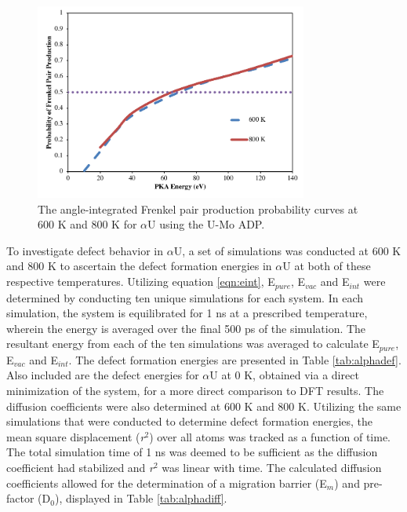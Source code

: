 \documentclass[review]{elsarticle}
\begin{document}
\begin{figure}[h]
 \centering
 \includegraphics[width=0.8\textwidth]{alphaA.png} 	
 \caption{The angle-integrated Frenkel pair production probability curves at 600 K and 800 K for $\alpha$U using the U-Mo ADP.}
 \label{fig:alpha}
\end{figure}

\FloatBarrier

To investigate defect behavior in $\alpha$U, a set of simulations was conducted at 600 K and 800 K to ascertain the defect formation energies in $\alpha$U at both of these respective temperatures. Utilizing equation \ref{eqn:eint}, E$_{pure}$, E$_{vac}$ and E$_{int}$ were determined by conducting ten unique simulations for each system. In each simulation, the system is equilibrated for 1 ns at a prescribed temperature, wherein the energy is averaged over the final 500 ps of the simulation. The resultant energy from each of the ten simulations was averaged to calculate E$_{pure}$, E$_{vac}$ and E$_{int}$. The defect formation energies are presented in Table \ref{tab:alphadef}. Also included are the defect energies for $\alpha$U at 0 K, obtained via a direct minimization of the system, for a more direct comparison to DFT results. The diffusion coefficients were also determined at 600 K and 800 K. Utilizing the same simulations that were conducted to determine defect formation energies, the mean square displacement (\textit{r}$^{2}$) over all atoms was tracked as a function of time. The total simulation time of 1 ns was deemed to be sufficient as the diffusion coefficient had stabilized and \textit{r}$^{2}$ was linear with time. The calculated diffusion coefficients allowed for the determination of a migration barrier (E$_{m}$) and pre-factor (D$_{0}$), displayed in Table \ref{tab:alphadiff}.
\end{document}
